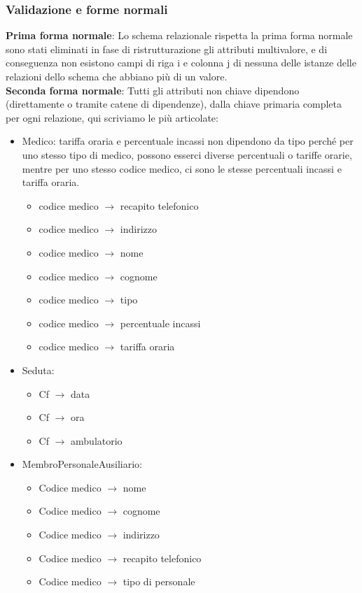 \documentclass[11pt]{article}
\begin{document}
\subsubsection{Validazione e forme normali}
\textbf{Prima forma normale}: Lo schema relazionale rispetta la prima forma normale sono stati eliminati in fase di ristrutturazione gli attributi multivalore, 
e di conseguenza non esistono campi di riga i e colonna j di nessuna delle istanze delle relazioni dello schema che abbiano più di un valore.\\

\textbf{Seconda forma normale}: Tutti gli attributi non chiave dipendono (direttamente o tramite catene di dipendenze), dalla chiave primaria completa per ogni relazione, qui scriviamo le più articolate:

\begin{itemize}
    \item Medico: tariffa oraria e percentuale incassi non dipendono da tipo perché per uno stesso tipo di medico, possono esserci diverse percentuali o tariffe orarie, mentre per uno stesso codice medico, ci sono le stesse percentuali incassi e tariffa oraria.
    \begin{itemize}
        \item codice medico $\rightarrow$ recapito telefonico
        \item codice medico $\rightarrow$ indirizzo
        \item codice medico $\rightarrow$ nome
        \item codice medico $\rightarrow$ cognome
        \item codice medico $\rightarrow$ tipo
        \item codice medico $\rightarrow$ percentuale incassi
        \item codice medico $\rightarrow$ tariffa oraria
    \end{itemize}

    \item Seduta:
    \begin{itemize}
        \item Cf $\rightarrow$ data
        \item Cf $\rightarrow$ ora
        \item Cf $\rightarrow$ ambulatorio
    \end{itemize}
    \item MembroPersonaleAusiliario:
    \begin{itemize}
        \item Codice medico $\rightarrow$ nome
        \item Codice medico $\rightarrow$ cognome
        \item Codice medico $\rightarrow$ indirizzo
        \item Codice medico $\rightarrow$ recapito telefonico
        \item Codice medico $\rightarrow$ tipo di personale
    \end{itemize}


\end{itemize}
\end{document}
